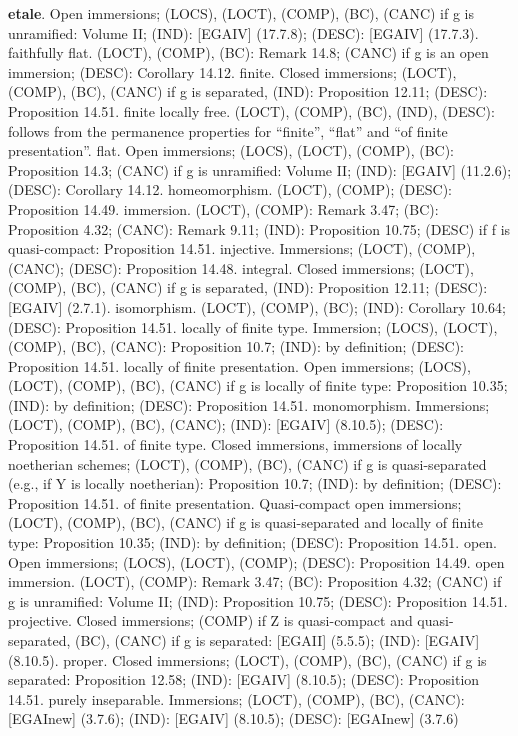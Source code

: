 \documentclass{article}
\begin{document}
\textbf{etale}. Open immersions; (LOCS), (LOCT), (COMP), (BC), (CANC) if g is unramified:
Volume II; (IND): [EGAIV] (17.7.8); (DESC): [EGAIV] (17.7.3).
faithfully flat. (LOCT), (COMP), (BC): Remark 14.8; (CANC) if g is an open immersion; (DESC): Corollary 14.12.
finite. Closed immersions; (LOCT), (COMP), (BC), (CANC) if g is separated, (IND):
Proposition 12.11; (DESC): Proposition 14.51.
finite locally free. (LOCT), (COMP), (BC), (IND), (DESC): follows from the permanence properties for “finite”, “flat” and “of finite presentation”.
flat. Open immersions; (LOCS), (LOCT), (COMP), (BC): Proposition 14.3; (CANC) if
g is unramified: Volume II; (IND): [EGAIV] (11.2.6); (DESC): Corollary 14.12.
homeomorphism. (LOCT), (COMP); (DESC): Proposition 14.49.
immersion. (LOCT), (COMP): Remark 3.47; (BC): Proposition 4.32; (CANC): Remark 9.11; (IND): Proposition 10.75; (DESC) if f is quasi-compact: Proposition 14.51.
injective. Immersions; (LOCT), (COMP), (CANC); (DESC): Proposition 14.48.
integral. Closed immersions; (LOCT), (COMP), (BC), (CANC) if g is separated, (IND):
Proposition 12.11; (DESC): [EGAIV] (2.7.1).
isomorphism. (LOCT), (COMP), (BC); (IND): Corollary 10.64; (DESC): Proposition 14.51.
locally of finite type. Immersion; (LOCS), (LOCT), (COMP), (BC), (CANC): Proposition 10.7; (IND): by definition; (DESC): Proposition 14.51.
locally of finite presentation. Open immersions; (LOCS), (LOCT), (COMP), (BC),
(CANC) if g is locally of finite type: Proposition 10.35; (IND): by definition;
(DESC): Proposition 14.51.
monomorphism. Immersions; (LOCT), (COMP), (BC), (CANC); (IND): [EGAIV]
(8.10.5); (DESC): Proposition 14.51.
of finite type. Closed immersions, immersions of locally noetherian schemes; (LOCT),
(COMP), (BC), (CANC) if g is quasi-separated (e.g., if Y is locally noetherian):
Proposition 10.7; (IND): by definition; (DESC): Proposition 14.51.
of finite presentation. Quasi-compact open immersions; (LOCT), (COMP), (BC),
(CANC) if g is quasi-separated and locally of finite type: Proposition 10.35; (IND):
by definition; (DESC): Proposition 14.51.
open. Open immersions; (LOCS), (LOCT), (COMP); (DESC): Proposition 14.49.
open immersion. (LOCT), (COMP): Remark 3.47; (BC): Proposition 4.32; (CANC) if
g is unramified: Volume II; (IND): Proposition 10.75; (DESC): Proposition 14.51.
projective. Closed immersions; (COMP) if Z is quasi-compact and quasi-separated,
(BC), (CANC) if g is separated: [EGAII] (5.5.5); (IND): [EGAIV] (8.10.5).
proper. Closed immersions; (LOCT), (COMP), (BC), (CANC) if g is separated: Proposition 12.58; (IND): [EGAIV] (8.10.5); (DESC): Proposition 14.51.
purely inseparable. Immersions; (LOCT), (COMP), (BC), (CANC): [EGAInew]
(3.7.6); (IND): [EGAIV] (8.10.5); (DESC): [EGAInew] (3.7.6)
\end{document}
